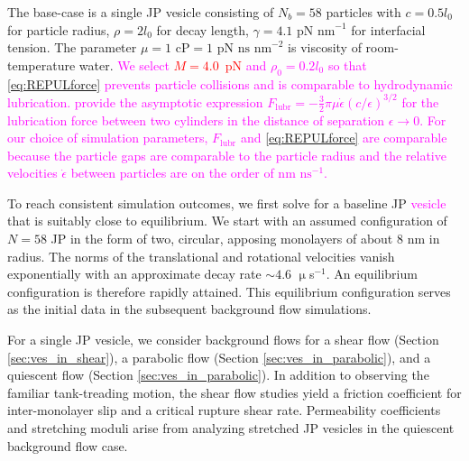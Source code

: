 \documentclass[lineno]{jfm}
\newcommand{\ReviewerOne}[1]{\textcolor{red}{#1}}
\newcommand{\ReviewerThree}[1]{\textcolor{magenta}{#1}}
\begin{document}
The base-case is a single JP vesicle consisting of $N_b = 58$ particles
with $c = 0.5 l_0$ for particle radius, $\rho = 2 l_0$ for decay length,
$\gamma = \text{4.1 pN nm}^{-1}$ for interfacial tension.
The parameter $\mu = \text{1 cP} = \text{1 pN
ns nm}^{-2}$ is viscosity of room-temperature water. 
\ReviewerThree{
  We select \ReviewerOne{$M=4.0$~$\text{pN}$} and $\rho_0 = 0.2l_0$ so that \eqref{eq:REPULforce}
  prevents particle collisions and is comparable to hydrodynamic lubrication.
  \citep{cawthorn_balmforth_2010} provide the asymptotic expression 
  $F_{\text{lubr}} = -\tfrac{3}{2}\pi \mu \dot \epsilon (c/\epsilon)^{3/2}$
  for the lubrication force between two cylinders in the distance of separation $\epsilon \to 0$.
  For our choice of simulation parameters, $F_{\text{lubr}}$ and \eqref{eq:REPULforce} are comparable
  because the particle gaps are comparable to the particle radius
  and the relative velocities $\dot \epsilon$ between particles are on
  the order of nm $\text{ns}^{-1}$.
}


To reach consistent simulation outcomes, we first solve for a baseline
JP \ReviewerThree{vesicle} that is suitably close to equilibrium. We
start with an assumed configuration of $N=58$ JP in the form of two,
circular, apposing monolayers of about $8$ nm in radius. The norms of
the translational and rotational velocities vanish exponentially with an
approximate decay rate $\sim 4.6$ $\upmu$s$^{-1}$. An equilibrium
configuration is therefore rapidly attained. This equilibrium
configuration serves as the initial data in the subsequent background
flow simulations.

For a single JP vesicle, we consider background flows for a shear flow 
(Section \ref{sec:ves_in_shear}), 
a parabolic flow (Section \ref{sec:ves_in_parabolic}),
and a quiescent flow (Section \ref{sec:ves_in_parabolic}). 
In addition to observing the familiar tank-treading motion, the shear
flow studies yield a friction coefficient for inter-monolayer slip 
and a critical rupture shear rate.  Permeability coefficients and 
stretching moduli arise from analyzing stretched JP vesicles in the 
quiescent background flow case.  
 
\end{document}
